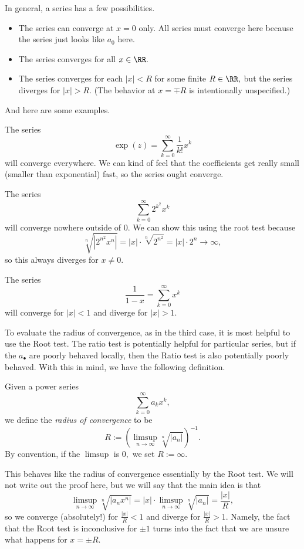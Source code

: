 In general, a series has a few possibilities.
\begin{itemize}
	\item The series can converge at $x=0$ only. All series must converge here because the series just looks like $a_0$ here.
	\item The series converges for all $x\in\RR.$
	\item The series converges for each $|x|<R$ for some finite $R\in\RR,$ but the series diverges for $|x|>R.$ (The behavior at $x=\mp R$ is intentionally unspecified.)
\end{itemize}
And here are some examples.
\begin{example}
	The series
	\[\exp(z)=\sum_{k=0}^\infty\frac1{k!}x^k\]
	will converge everywhere. We can kind of feel that the coefficients get really small (smaller than exponential) fast, so the series ought converge.
\end{example}
\begin{example}
	The series
	\[\sum_{k=0}^\infty2^{k^2}x^k\]
	will converge nowhere outside of $0.$ We can show this using the root test because
	\[\sqrt[n]{|2^{n^2}x^n|}=|x|\cdot\sqrt[n]{2^{n^2}}=|x|\cdot2^n\to\infty,\]
	so this always diverges for $x\ne0.$
\end{example}
\begin{example}
	The series
	\[\frac1{1-x}=\sum_{k=0}^\infty x^k\]
	will converge for $|x|<1$ and diverge for $|x|>1.$
\end{example}
To evaluate the radius of convergence, as in the third case, it is most helpful to use the Root test. The ratio test is potentially helpful for particular series, but if the $a_\bullet$ are poorly behaved locally, then the Ratio test is also potentially poorly behaved. With this in mind, we have the following definition.
\begin{definition}
	Given a power series
	\[\sum_{k=0}^\infty a_kx^k,\]
	we define the \textit{radius of convergence} to be
	\[R:=\left(\limsup_{n\to\infty}\sqrt[n]{|a_n|}\right)^{-1}.\]
	By convention, if the $\limsup$ is $0,$ we set $R:=\infty.$
\end{definition}
This behaves like the radius of convergence essentially by the Root test. We will not write out the proof here, but we will say that the main idea is that
\[\limsup_{n\to\infty}\sqrt[n]{|a_nx^n|}=|x|\cdot\limsup_{n\to\infty}\sqrt[n]{|a_n|}=\frac{|x|}R,\]
so we converge (absolutely!) for $\frac{|x|}R<1$ and diverge for $\frac{|x|}R>1.$ Namely, the fact that the Root test is inconclusive for $\pm1$ turns into the fact that we are unsure what happens for $x=\pm R.$

